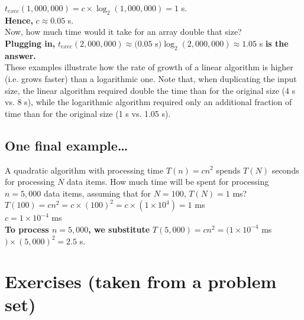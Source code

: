 \documentclass[11 pt]{article}
\begin{document}
$t_{exec}(1,000,000) = c \times \log_{2}(1,000,000) = 1$ s. \\

\textbf{Hence,} $c \approx 0.05$ s. \\

\noindent Now, how much time would it take for an array double that size? \\

\textbf{Plugging in,} $t_{exec}(2,000,000) \approx (0.05$ s$) \log_{2}(2,000,000) \approx 1.05$ s \textbf{is the answer.} \\

\noindent These examples illustrate how the rate of growth of a linear algorithm is higher (i.e. grows faster) than a logarithmic one. Note that, when duplicating the input size, the linear algorithm required double the time than for the original size (4 s vs. 8 s), while the logarithmic algorithm required only an additional fraction of time than for the original size (1 s vs. 1.05 s).

\subsection{One final example\dots}

A quadratic algorithm with processing time $T(n) = c n^{2}$ spends $T(N)$ seconds for processing $N$ data items. How much time will be spent for processing $n = 5,000$ data items, assuming that for $N = 100$, $T(N) = 1$ ms? \\

$T(100) = c n^{2} = c \times (100)^{2} = c \times (1 \times 10^{4}) = 1$ ms \\

$c = 1 \times 10^{-4}$ ms \\

\textbf{To process $n = 5,000$, we substitute} $T(5,000) = c n^{2} = (1 \times 10^{-4}$ ms$) \times (5,000)^{2} = 2.5$ s.

\newpage

\section{Exercises (taken from a problem set)}
\end{document}
